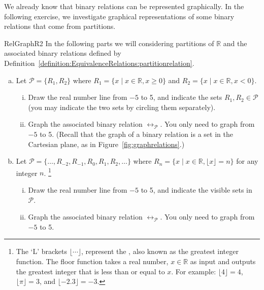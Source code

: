 We already know that binary relations can be represented graphically. In the following exercise, we investigate graphical representations of some binary relations that come from partitions.

\begin{exercise}{RelGraphR2}
In the following parts we will considering partitions of $\mathbb{R}$ and the associated binary relations defined by Definition~\ref{definition:EquivalenceRelations:partitionrelation}. 
\begin{enumerate}[(a)]
\item Let $\mathcal{P}=\{R_1, R_2\}$ where $R_1=\{x \mid x \in \mathbb{R}, x \geq 0\}$ and $R_2=\{x \mid x \in \mathbb{R}, x < 0\}$.
\begin{enumerate}[(i)]
\item Draw the real number line from $-5$ to 5, and indicate the sets $R_1, R_2 \in \mathcal{P}$ (you may indicate the two sets by circling them separately).
\item Graph the associated binary relation $\rel_\mathcal{P}$. You only need to graph from $-5$ to 5. (Recall that the graph of a binary relation is a set in the Cartesian plane, as in Figure~\ref{fig:graphrelations}.)
\end{enumerate}

\item Let $\mathcal{P}=\{\ldots, R_{-2}, R_{-1}, R_0, R_1, R_2, \ldots \}$ where $R_n=\{x \mid x \in \mathbb{R}, \lfloor x \rfloor = n \}$ for any integer $n$. \footnote{The `L' brackets $\lfloor \cdots \rfloor$,  represent the , also known as the greatest integer function. The floor function takes a real number, $x \in \mathbb{R}$ as input and outputs the greatest integer that is less than or equal to $x$.  For example: $\lfloor 4 \rfloor = 4$, $\lfloor \pi \rfloor = 3$, and $\lfloor -2.3 \rfloor = -3$.}
\begin{enumerate}[(i)]
\item Draw the real number line from $-5$ to 5, and indicate the visible sets in $\mathcal{P}$.
\item Graph the associated binary relation $\rel_\mathcal{P}$. You only need to graph from $-5$ to 5.
\end{enumerate}


\end{enumerate}
\end{exercise}
